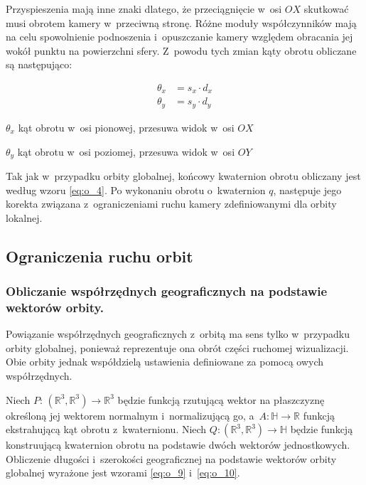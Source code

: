 Przyspieszenia mają inne znaki dlatego, że przeciągnięcie w~osi $OX$ skutkować musi obrotem kamery w~przeciwną stronę. Różne moduły współczynników mają na celu spowolnienie podnoszenia i~opuszczanie kamery względem obracania jej wokół punktu na powierzchni sfery. Z~powodu tych zmian kąty obrotu obliczane są następująco:
\begin{samepage}
    \begin{align}
        \label{eq:o_8}
        \theta_x &= s_x \cdot d_x \\
        \theta_y &= s_y \cdot d_y
    \end{align}
    \begin{eqexpl}[25mm]
        \item {$\theta_x$} kąt obrotu w~osi pionowej, przesuwa widok w~osi $OX$
        \item {$\theta_y$} kąt obrotu w~osi poziomej, przesuwa widok w~osi $OY$
    \end{eqexpl}
    \vspace{\baselineskip}
\end{samepage}

Tak jak w~przypadku orbity globalnej, końcowy kwaternion obrotu obliczany jest według wzoru \ref{eq:o_4}. Po wykonaniu obrotu o~kwaternion $q$, następuje jego korekta związana z~ograniczeniami ruchu kamery zdefiniowanymi dla orbity lokalnej.

\subsection{Ograniczenia ruchu orbit}

\subsubsection{Obliczanie współrzędnych geograficznych na podstawie wektorów orbity.}
Powiązanie współrzędnych geograficznych z~orbitą ma sens tylko w~przypadku orbity globalnej, ponieważ reprezentuje ona obrót części ruchomej wizualizacji. Obie orbity jednak współdzielą ustawienia definiowane za pomocą owych współrzędnych.

Niech $P:\,(\mathbb{R}^3, \mathbb{R}^3) \to \mathbb{R}^3$ będzie funkcją rzutującą wektor na płaszczyznę określoną jej wektorem normalnym i~normalizującą go, a~$A: \mathbb{H} \to \mathbb{R}$ funkcją ekstrahującą kąt obrotu z~kwaternionu. Niech $Q:(\mathbb{R}^3, \mathbb{R}^3) \to \mathbb{H}$ będzie funkcją konstruującą kwaternion obrotu na podstawie dwóch wektorów jednostkowych. Obliczenie długości i~szerokości geograficznej na podstawie wektorów orbity globalnej wyrażone jest wzorami \ref{eq:o_9} i~\ref{eq:o_10}.

